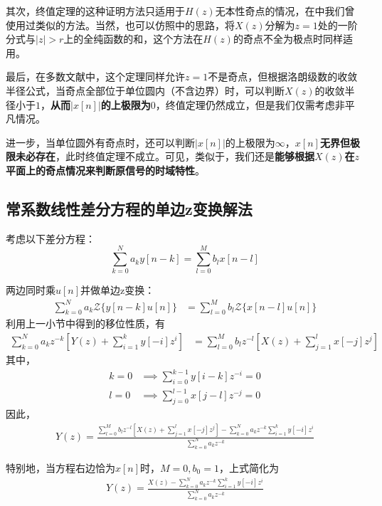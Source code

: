 其次，终值定理的这种证明方法只适用于$H(z)$无本性奇点的情况，在中我们曾使用过类似的方法。当然，也可以仿照中的思路，将$X(z)$分解为$z=1$处的一阶分式与$|z|>r$上的全纯函数的和，这个方法在$H(z)$的奇点不全为极点时同样适用。

最后，在多数文献中，这个定理同样允许$z=1$不是奇点，但根据洛朗级数的收敛半径公式，当奇点全部位于单位圆内（不含边界）时，可以判断$X(z)$的收敛半径小于$1$，\textbf{从而$|x[n]|$的上极限为$0$}，终值定理仍然成立，但是我们仅需考虑非平凡情况。

进一步，当单位圆外有奇点时，还可以判断$|x[n]|$的上极限为$\infty$，\textbf{$x[n]$无界但极限未必存在}，此时终值定理不成立。可见，类似于，我们还是\textbf{能够根据$X(z)$在$z$平面上的奇点情况来判断原信号的时域特性}。

\subsection{常系数线性差分方程的单边z变换解法}\label{sub:z_difference_equation}

考虑以下差分方程：
$$\sum_{k=0}^{N}a_k y[n-k] = \sum_{l=0}^{M}b_l x[n-l]$$


两边同时乘$u[n]$并做单边z变换：
\begin{align*}
    \sum_{k=0}^{N}a_k \mathcal{Z}\{y[n-k]u[n]\}&=\sum_{l=0}^{M}b_l \mathcal{Z}\{x[n-l]u[n]\}
\end{align*}
利用上一小节中得到的移位性质，有\begin{align*}
    \sum_{k=0}^{N}a_k z^{-k}\left[Y(z)+\sum_{i=1}^{k}y[-i]z^{i}\right]&=\sum_{l=0}^{M}b_l z^{-l}\left[X(z)+\sum_{j=1}^{l}x[-j]z^{j}\right]
\end{align*}
其中，\begin{align*}
    k=0&\implies \sum_{i=0}^{k-1}y[i-k]z^{-i}=0\\
    l=0&\implies \sum_{j=0}^{l-1}x[j-l]z^{-j}=0
\end{align*}
因此，\begin{align*}
    Y(z)=\frac{\sum_{l=0}^{M}b_l z^{-l}\left[X(z)+\sum_{j=1}^{l}x[-j]z^{j}\right]-\sum_{k=0}^{N}a_k z^{-k}\sum_{i=1}^{k}y[-i]z^{i}}{\sum_{k=0}^{N}a_k z^{-k}}
\end{align*}

特别地，当方程右边恰为$x[n]$时，$M=0,b_0=1$，上式简化为\begin{align*}
    Y(z)=\frac{X(z)-\sum_{k=0}^{N}a_k z^{-k}\sum_{i=1}^{k}y[-i]z^{i}}{\sum_{k=0}^{N}a_k z^{-k}}
\end{align*}

